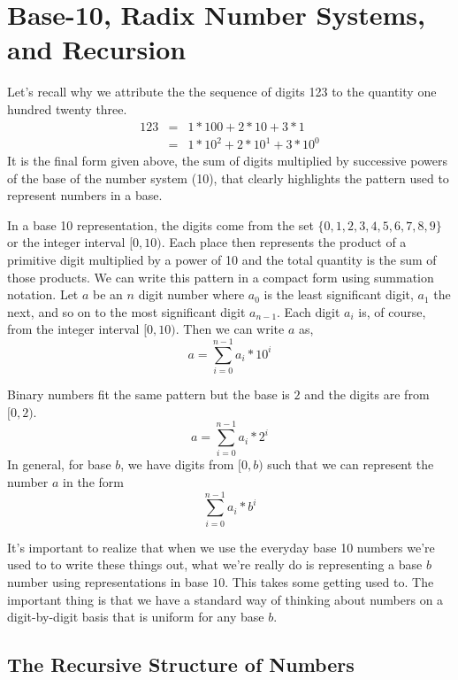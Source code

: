 \documentclass[10pt]{article}
\begin{document}
\section{Base-10, Radix Number Systems, and Recursion}

Let's recall why we attribute the the sequence of digits 123 to the quantity one hundred twenty three.
\[
\begin{array}{rcl}
123 &=& 1*100 + 2*10 + 3*1 \\
    &=& 1*10^2 + 2*10^1 + 3*10^0
\end{array}
\]
It is the final form given above, the sum of digits multiplied by successive powers of the base of the number system (10), that clearly highlights the pattern used to represent numbers in a base. 

In a base 10 representation, the digits come from the set $\{0,1,2,3,4,5,6,7,8,9\}$ or the integer interval $[0,10)$. Each place then represents the product of a primitive digit multiplied by a power of 10 and the total quantity is the sum of those products. We can write this pattern in a compact form using summation notation. Let $a$ be an $n$ digit number where $a_0$ is the least significant digit, $a_1$ the next, and so on to the most significant digit $a_{n-1}$. Each digit $a_i$ is, of course, from the integer interval $[0,10)$. Then we can write $a$ as,
\[
a = \sum\limits_{i=0}^{n-1} a_i*10^{i}
\] 

Binary numbers fit the same pattern but the base is $2$ and the digits are from $[0,2)$.
\[
a = \sum\limits_{i=0}^{n-1} a_i*2^{i}
\] 
In general, for base $b$, we have digits from $[0,b)$ such that we can represent the number $a$ in the form
\[
\sum\limits_{i=0}^{n-1} a_i*b^{i}
\]

It's important to realize that when we use the everyday base 10 numbers we're used to to write these things out, what we're really do is representing a base $b$ number using representations in base $10$. This takes some getting used to. The important thing is that we have a standard way of thinking about numbers on a digit-by-digit basis that is uniform for any base $b$. 

\subsection*{The Recursive Structure of Numbers}
\end{document}
